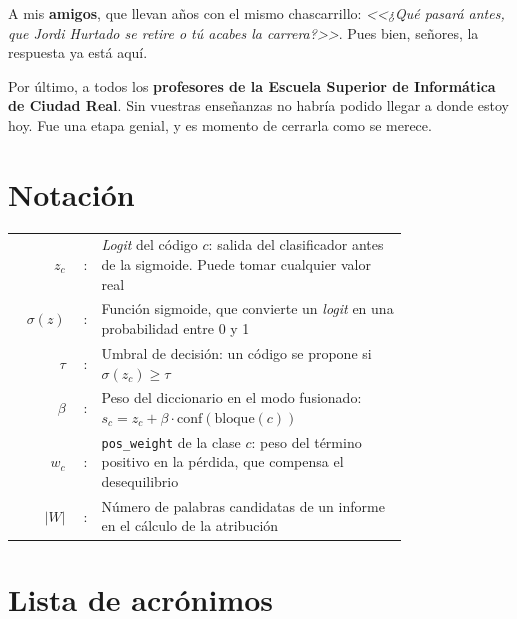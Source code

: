 A mis \textbf{amigos}, que llevan años con el mismo chascarrillo: \emph{<<¿Qué pasará antes, que Jordi Hurtado se retire o tú acabes la carrera?>>}. Pues bien, señores, la respuesta ya está aquí.

Por último, a todos los \textbf{profesores de la Escuela Superior de Informática de Ciudad Real}. Sin vuestras enseñanzas no habría podido llegar a donde estoy hoy. Fue una etapa genial, y es momento de cerrarla como se merece.

\firma %


\section*{Notación}

\begin{table}[htb]
\begin{tabular}{r r p{0.78\linewidth}}
$z_c$        & : & \emph{Logit} del código $c$: salida del clasificador antes de la sigmoide. Puede tomar cualquier valor real \\
$\sigma(z)$  & : & Función sigmoide, que convierte un \emph{logit} en una probabilidad entre 0 y 1 \\
$\tau$       & : & Umbral de decisión: un código se propone si $\sigma(z_c) \geq \tau$ \\
$\beta$      & : & Peso del diccionario en el modo fusionado: $s_c = z_c + \beta \cdot \mathrm{conf}(\mathrm{bloque}(c))$ \\
$w_c$        & : & \texttt{pos\_weight} de la clase $c$: peso del término positivo en la pérdida, que compensa el desequilibrio \\
$|W|$        & : & Número de palabras candidatas de un informe en el cálculo de la atribución \\
\end{tabular}
\end{table}

\clearpage
\section*{Lista de acrónimos}

